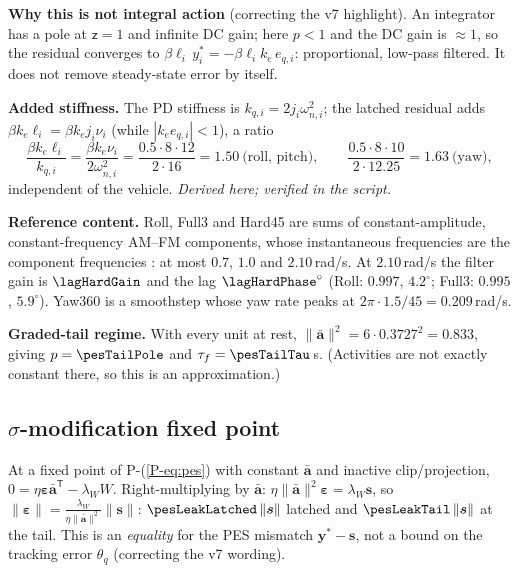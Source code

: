 \documentclass[11pt]{article}
\newcommand{\srcroot}{../../..}
\newcommand{\T}{^{\mathsf T}}
\newcommand{\PE}[1]{P-(\ref{P-#1})}          %
\newcommand{\code}[1]{\texttt{\detokenize{#1}}}
\theoremstyle{remark}
\newcommand{\listing}[4]{%
  }
\begin{document}
\textbf{Why this is not integral action} (correcting the v7 highlight). An integrator has a pole at
$\mathsf z=1$ and infinite DC gain; here $p<1$ and the DC gain is $\approx1$, so the residual converges to
$\beta\ell_i\,y^*_i=-\beta\ell_ik_e\,e_{q,i}$: proportional, low-pass filtered. It does not remove
steady-state error by itself.

\textbf{Added stiffness.} The PD stiffness is $k_{q,i}=2j_i\omega_{n,i}^2$; the latched residual adds
$\beta k_e\ell_i=\beta k_e j_i\nu_i$ (while $|k_ee_{q,i}|<1$), a ratio
\[
\frac{\beta k_e\ell_i}{k_{q,i}}=\frac{\beta k_e\nu_i}{2\omega_{n,i}^2}
=\frac{0.5\cdot8\cdot12}{2\cdot16}=1.50\ \text{(roll, pitch)},\qquad
\frac{0.5\cdot8\cdot10}{2\cdot12.25}=1.63\ \text{(yaw)},
\]
independent of the vehicle. \emph{Derived here; verified in the script.}

\textbf{Reference content.} Roll, Full3 and Hard45 are sums of constant-amplitude, constant-frequency
AM--FM components, whose instantaneous frequencies are the component frequencies
\cite{sandoval2018instantaneous}: at most $0.7$, $1.0$ and $2.10$\,rad/s. At $2.10$\,rad/s the filter
gain is $\lagHardGain$ and the lag $\lagHardPhase^\circ$ (Roll: $0.997$, $4.2^\circ$; Full3: $0.995$,
$5.9^\circ$). Yaw360 is a smoothstep whose yaw rate peaks at $2\pi\cdot1.5/45=0.209$\,rad/s.

\textbf{Graded-tail regime.} With every unit at rest, $\|\bar{\bm a}\|^2=6\cdot0.3727^2=0.833$, giving
$p=\pesTailPole$ and $\tau_f=\pesTailTau$\,s. (Activities are not exactly constant there, so this is an
approximation.)
\listing{experiments/theory_certificate_2026-09-12/compute_local_certificate.py}{149}{162}{regimes, lag, stiffness ratio}

\subsection{$\sigma$-modification fixed point}
At a fixed point of \PE{eq:pes} with constant $\bar{\bm a}$ and inactive clip/projection,
$0=\eta\bm\varepsilon\bar{\bm a}\T-\lambda_WW$. Right-multiplying by $\bar{\bm a}$:
$\eta\|\bar{\bm a}\|^2\bm\varepsilon=\lambda_W\bm s$, so
$\|\bm\varepsilon\|=\frac{\lambda_W}{\eta\|\bar{\bm a}\|^2}\|\bm s\|$: $\pesLeakLatched\,\|\bm s\|$ latched and
$\pesLeakTail\,\|\bm s\|$ at the tail. This is an \emph{equality} for the PES mismatch
$\bm y^*-\bm s$, not a bound on the tracking error $\theta_q$ (correcting the v7 wording).
\end{document}
